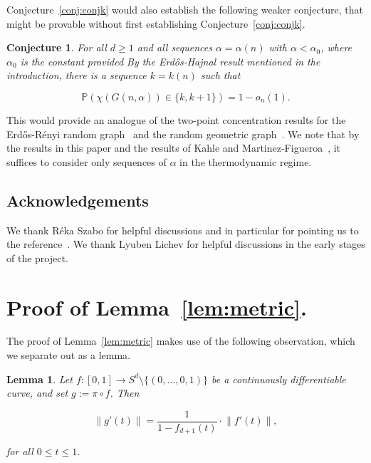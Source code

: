 \documentclass[11pt]{article}%
\newtheorem{lemma}[lemma]{Lemma}
\newtheorem{conjecture}[conjecture]{Conjecture}
\newcommand{\norm}[1]{\ensuremath{\left\|#1\right\|}}
\newcommand{\Pee}[0]{\ensuremath{{\mathbb P}}}
\begin{document}
Conjecture~\ref{conj:conjk} would also establish the following weaker conjecture, that might be provable without 
first establishing Conjecture~\ref{conj:conjk}.

\begin{conjecture}\label{conj:twopoint}
For all $d \geq 1$ and all sequences $\alpha = \alpha(n)$ with $\alpha < \alpha_0$, where $\alpha_0$ is 
the constant provided By the Erd\H{o}s-Hajnal result mentioned in the introduction, there is a 
sequence $k=k(n)$ such that 

$$ \Pee\left( \chi(G(n,\alpha)) \in \{k,k+1\} \right) = 1-o_n(1). $$

\end{conjecture}

This would provide an analogue of the two-point concentration results for the Erd\H{o}s-R\'enyi random 
graph~\cite{Luczak91,AlonKrivelevich} and the random geometric graph~\cite{Mullertwopoint}.
We note that by the results in this paper and the results of Kahle and Martinez-Figueroa~\cite{KahleFig}, it suffices
to consider only sequences of $\alpha$ in the thermodynamic regime.


\subsection*{Acknowledgements}

We thank R\'eka Szabo for helpful discussions and in particular for pointing us to the reference~\cite{BalisterEtal}.
We thank Lyuben Lichev for helpful discussions in the early stages of the project.





\appendix


\section{Proof of Lemma~\ref{lem:metric}.\label{sec:metric}}


The proof of Lemma~\ref{lem:metric} makes use of the following observation, which we separate out 
as a lemma.

\begin{lemma}
Let $f : [0,1] \to S^d \setminus \{(0,\dots,0,1)\}$ be a continuously differentiable curve, and set 
$g := \pi \circ f$.
Then 

$$ \norm{g'(t)} = \frac{1}{1-f_{d+1}(t)}\cdot\norm{f'(t)}, $$

\noindent
for all $0\leq t \leq 1$.
\end{lemma}
\end{document}
